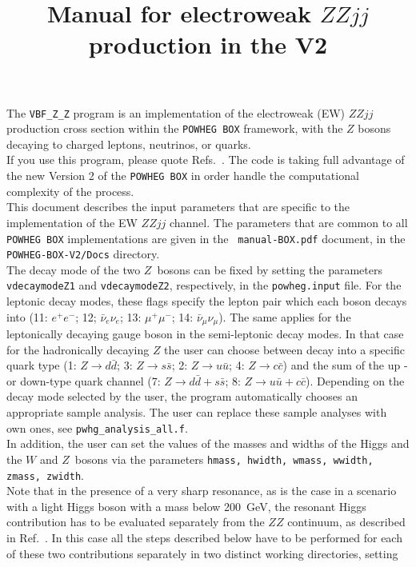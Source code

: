 \documentclass[a4paper,11pt]{article}
\title{Manual for electroweak $ZZ jj$ production in the \POWHEGBOX{} V2}
\date{}
\newcommand\POWHEGBOX{{\tt POWHEG BOX}}
\def\pbox{{\tt POWHEG BOX}}
\begin{document}
\maketitle
%
\noindent
The {\tt VBF\_Z\_Z} program is an implementation of the electroweak
(EW) 
$ZZ jj$ production cross section within the \pbox{} framework, with the 
$Z$ bosons decaying to charged leptons, neutrinos, or quarks. 
\\[2ex]
If you use this program, please quote
Refs.~\cite{Jager:2006cp,JKZ,Alioli:2010xd}. The code is taking full
advantage of the new Version 2 of the \POWHEGBOX{} in order handle the
computational complexity of the process. 
\\[2ex]
This document describes the input parameters that are specific to the
implementation of the EW $ZZjj$ channel.  The parameters that are
common to all {\tt POWHEG BOX} implementations are given in the {\tt
  manual-BOX.pdf} document, in the {\tt POWHEG-BOX-V2/Docs} directory.
\\[2ex]
The decay mode of the two $Z$~bosons can be fixed by setting
the parameters {\tt vdecaymodeZ1} and {\tt vdecaymodeZ2},
respectively, in the {\tt powheg.input} file. For the leptonic decay
modes, these flags specify the lepton pair which each boson decays into
(11: $e^+e^-$; 12; $\bar{\nu}_e\nu_e$; 13: $\mu^+\mu^-$; 14:
$\bar{\nu}_\mu \nu_\mu$). The same applies for the leptonically decaying gauge boson
in the semi-leptonic decay modes. In that case for the hadronically
decaying $Z$ the user can choose between decay into a specific quark
type (1: $Z\to d\bar d$; 3: $Z\to s\bar s$; 2: $Z\to u\bar u$;
4: $Z\to c\bar c$) and the sum of the up - or down-type quark channel (7:
$Z\to d\bar d + s\bar s$; 8: $Z\to u\bar u + c\bar c$). 
%
Depending on the decay mode selected by the user, the program automatically chooses an appropriate sample analysis. The user can replace these sample analyses with own ones, see {\tt pwhg\_analysis\_all.f}. 
\\[2ex]
In addition, the user can set the values of the masses and widths of
the Higgs and the $W$ and $Z$~bosons via the parameters {\tt hmass, hwidth,
  wmass, wwidth,   zmass, zwidth}.
\\[2ex]
Note that 
in the presence of a very sharp resonance, as is the case in a
scenario with a light Higgs boson with a mass below 200~GeV, the
resonant Higgs contribution has to be evaluated separately from the
$ZZ$ continuum, as described in Ref.~\cite{JKZ}. In this case all the
steps described below have to be performed for each of these two
contributions separately in two distinct working directories, setting
\end{document}
